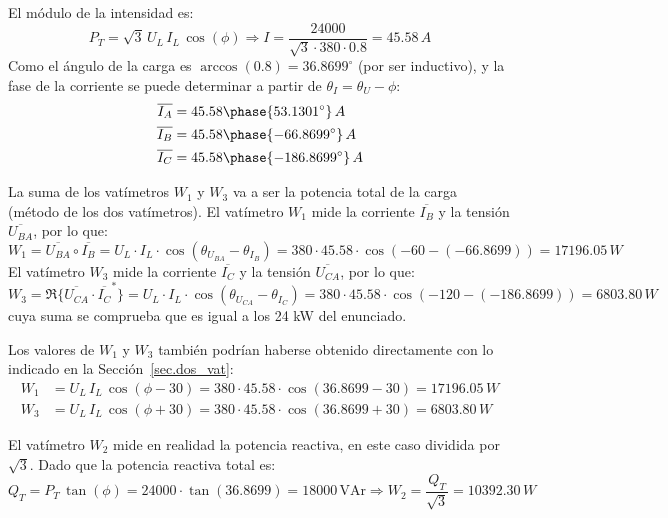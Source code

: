 \begin{example}
El módulo de la intensidad es:
\begin{equation*}
    P_T=\sqrt{3}\,U_L\,I_L\,\cos(\phi)\Rightarrow I=\dfrac{24000}{\sqrt{3}\cdot 380\cdot 0.8}=45.58\,A
\end{equation*}
Como el ángulo de la carga es $\arccos{(0.8)}=36.8699^\circ$ (por ser inductivo), y la fase de la corriente se puede determinar a partir de $\theta_I=\theta_U-\phi$:
\begin{align*}
    \overline{I_A}&=45.58\phase{53.1301^\circ}\,A\\
    \overline{I_B}&=45.58\phase{-66.8699^\circ}\,A\\
    \overline{I_C}&=45.58\phase{-186.8699^\circ}\,A
\end{align*}

La suma de los vatímetros $W_1$ y $W_3$ va a ser la potencia total de la carga (método de los dos vatímetros). El vatímetro $W_1$ mide la corriente $\overline{I_B}$ y la tensión $\overline{U_{BA}}$, por lo que: \begin{equation*}
    W_1=\overline{U_{BA}}\circ \overline{I_B}=U_{L}\cdot I_L\cdot \cos{(\theta_{U_{BA}}-\theta_{I_B})}= 380\cdot 45.58\cdot \cos(-60-(-66.8699))=17196.05\,W
\end{equation*}
El vatímetro $W_3$ mide la corriente $\overline{I_C}$ y la tensión $\overline{U_{CA}}$, por lo que: \begin{equation*}
    W_3=\Re\{\overline{U_{CA}}\cdot \overline{I_C}^*\}=U_{L}\cdot I_L\cdot \cos{(\theta_{U_{CA}}-\theta_{I_C})}= 380\cdot 45.58\cdot \cos(-120-(-186.8699))=6803.80\,W
\end{equation*}
cuya suma se comprueba que es igual a los 24 kW del enunciado.
\begin{remark}
    Los valores de $W_1$ y $W_3$ también podrían haberse obtenido directamente con lo indicado en la Sección~\ref{sec.dos_vat}:
    \begin{align*}
        W_1&=U_L\,I_L\,\cos(\phi-30)=380\cdot 45.58\cdot \cos(36.8699-30)=17196.05\,W\\
        W_3&=U_L\,I_L\,\cos(\phi+30)=380\cdot 45.58\cdot \cos(36.8699+30)=6803.80\,W
    \end{align*}
\end{remark}

El vatímetro $W_2$ mide en realidad la potencia reactiva, en este caso dividida por $\sqrt{3}$. Dado que la potencia reactiva total es:
\begin{equation*}
    Q_T=P_T\,\tan(\phi)=24000\cdot\tan(36.8699)=18000 \,\text{VAr}\Rightarrow W_2=\dfrac{Q_T}{\sqrt{3}}=10392.30\,W
\end{equation*}


\end{example}
